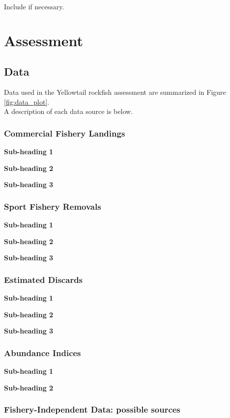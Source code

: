 \documentclass[12pt,]{article}
\begin{document}
Include if necessary.

\section{Assessment}\label{assessment}

\subsection{Data}\label{data}

Data used in the Yellowtail rockfish assessment are summarized in Figure
\ref{fig:data_plot}.\\
A description of each data source is below.

\subsubsection{Commercial Fishery
Landings}\label{commercial-fishery-landings}

\textbf{Sub-heading 1}

\textbf{Sub-heading 2}

\textbf{Sub-heading 3}

\subsubsection{Sport Fishery Removals}\label{sport-fishery-removals}

\textbf{Sub-heading 1}

\textbf{Sub-heading 2}

\textbf{Sub-heading 3}

\subsubsection{Estimated Discards}\label{estimated-discards}

\textbf{Sub-heading 1}

\textbf{Sub-heading 2}

\textbf{Sub-heading 3}

\subsubsection{Abundance Indices}\label{abundance-indices}

\textbf{Sub-heading 1}

\textbf{Sub-heading 2}

\subsubsection{Fishery-Independent Data: possible
sources}\label{fishery-independent-data-possible-sources}
\end{document}
